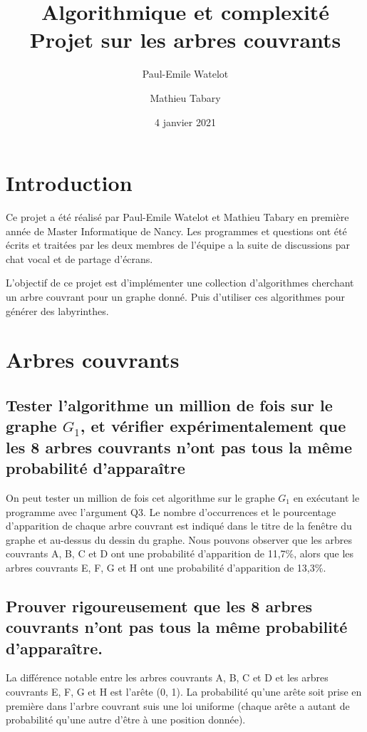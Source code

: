 \documentclass[a4paper,11pt]{article}
\title{Algorithmique et complexité Projet sur les arbres couvrants}
\author{Paul-Emile Watelot \and Mathieu Tabary}
\date{4 janvier 2021}
\begin{document}
    \maketitle
    \newpage
    \tableofcontents
    \newpage

    \section{Introduction}\label{sec:introduction}
        Ce projet a été réalisé par Paul-Emile Watelot et Mathieu Tabary en première année de Master Informatique de Nancy.
        Les programmes et questions ont été écrits et traitées par les deux membres de l'équipe a la suite de discussions par chat vocal et de partage d'écrans.

        L'objectif de ce projet est d'implémenter une collection d'algorithmes cherchant un arbre couvrant pour un graphe donné.
        Puis d'utiliser ces algorithmes pour générer des labyrinthes.
    
    \section{Arbres couvrants}\label{sec:arbres-couvrants}
        
        \newpage

        \subsection{Tester l'algorithme un million de fois sur le graphe $G_1$,
        et vérifier expérimentalement que les 8 arbres couvrants n'ont pas tous la même probabilité d'apparaître}\label{subsec:Q3}
            On peut tester un million de fois cet algorithme sur le graphe $G_1$ en exécutant le programme avec l'argument Q3.
            Le nombre d'occurrences et le pourcentage d'apparition de chaque arbre couvrant est
            indiqué dans le titre de la fenêtre du graphe et au-dessus du dessin du graphe.
            Nous pouvons observer que les arbres couvrants A, B, C et D ont une probabilité d'apparition de 11,7\%,
            alors que les arbres couvrants E, F, G et H ont une probabilité d'apparition de 13,3\%.

        \subsection{Prouver rigoureusement que les 8 arbres couvrants n'ont pas tous la même probabilité d'apparaître.}\label{subsec:Q4}
            La différence notable entre les arbres couvrants A, B, C et D et les arbres couvrants E, F, G et H est l'arête (0, 1).
            La probabilité qu'une arête soit prise en première dans l'arbre couvrant suis une loi uniforme
            (chaque arête a autant de probabilité qu'une autre d'être à une position donnée).\\
\end{document}
